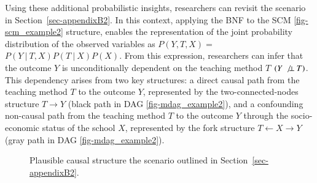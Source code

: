 \documentclass[
  authoryear,
  review,
  1p]{elsarticle}
\begin{document}
Using these additional probabilistic insights, researchers can revisit
the scenario in Section~\ref{sec-appendixB2}. In this context, applying
the BNF to the SCM \ref{fig-scm_example2} structure, enables the
representation of the joint probability distribution of the observed
variables as \(P(Y, T, X) =\) \(P(Y \:|\:T, X) P(T \:|\:X) P(X)\). From
this expression, researchers can infer that the outcome \(Y\) is
unconditionally dependent on the teaching method \(T\)
\((Y \:\not\bot\:T)\). This dependency arises from two key structures: a
direct causal path from the teaching method \(T\) to the outcome \(Y\),
represented by the two-connected-nodes structure \(T \rightarrow Y\)
(black path in DAG \ref{fig-mdag_example2}), and a confounding
non-causal path from the teaching method \(T\) to the outcome \(Y\)
through the socio-economic status of the school \(X\), represented by
the fork structure \(T \leftarrow X \rightarrow Y\) (gray path in DAG
\ref{fig-mdag_example2}).

\begin{figure}

\begin{minipage}{0.50\linewidth}

\centering{

\[
\begin{aligned}
  X & := x \\
  T & := f_{T}(x,e_{T}) \\
  Y & := f_{Y}(T,x,e_{Y}) \\
  e_{T} & \:\bot\:e_{X} \\
  e_{T} & \:\bot\:e_{Y} \\
  e_{X} & \:\bot\:e_{Y}
\end{aligned}
\]

}


\end{minipage}%
%
\begin{minipage}{0.50\linewidth}



\end{minipage}%

\caption{\label{fig-example2}Plausible causal structure the scenario
outlined in Section~\ref{sec-appendixB2}.}

\end{figure}%
\end{document}
